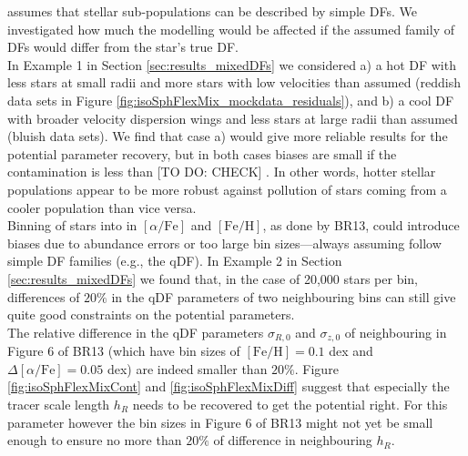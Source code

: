 
 \RM{} assumes that stellar sub-populations can be described by simple DFs. We investigated how much the modelling would be affected if the assumed family of DFs would differ from the star's true DF.
\\In Example 1 in Section \ref{sec:results_mixedDFs} we considered a) a hot DF with less stars at small radii and more stars with low velocities than assumed (reddish data sets in Figure \ref{fig:isoSphFlexMix_mockdata_residuals}), and b) a cool DF with broader velocity dispersion wings and less stars at large radii than assumed (bluish data sets).  We find that case a) would give more reliable results for the potential parameter recovery, but in both cases biases are small if the contamination is less than [TO DO: CHECK] . In other words, hotter stellar populations appear to be more robust against pollution of stars coming from a cooler population than vice versa. 
\\Binning of stars into \MAPs{} in $[\alpha/\mathrm{Fe}]$ and $[\mathrm{Fe}/\mathrm{H}]$, as done by BR13, could introduce biases due to abundance errors or too large bin sizes---always assuming \MAPs{} follow simple DF families (e.g., the qDF). In Example 2 in Section \ref{sec:results_mixedDFs} we found that, in the case of 20,000 stars per bin, differences of $20\%$ in the qDF parameters of two neighbouring bins can still give quite good constraints on the potential parameters.
\\The relative difference in the qDF parameters $\sigma_{R,0}$ and $\sigma_{z,0}$ of neighbouring \MAPs{} in Figure 6 of BR13 (which have bin sizes of $[\mathrm{Fe}/\mathrm{H}] = 0.1$ dex and $\Delta [\alpha/\mathrm{Fe}] = 0.05$ dex) are indeed smaller than $20\%$. Figure \ref{fig:isoSphFlexMixCont} and \ref{fig:isoSphFlexMixDiff} suggest that especially the tracer scale length $h_R$ needs to be recovered to get the potential right. For this parameter however the bin sizes in Figure 6 of BR13 might not yet be small enough to ensure no more than $20\%$ of difference in neighbouring $h_R$.


